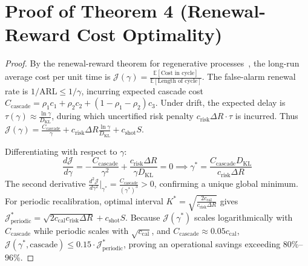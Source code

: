 \documentclass[aps,pra,twocolumn,superscriptaddress,10pt,floatfix]{revtex4-2}
\begin{document}
\section{Proof of Theorem 4 (Renewal-Reward Cost Optimality)}
\label{app:proof_thm4}
\begin{proof}
By the renewal-reward theorem for regenerative processes~\cite{ross1996stochastic}, the long-run average cost per unit time is $\mathcal{J}(\gamma) = \frac{\mathbb{E}[\text{Cost in cycle}]}{\mathbb{E}[\text{Length of cycle}]}$.
The false-alarm renewal rate is $1/\mathrm{ARL} \le 1/\gamma$, incurring expected cascade cost $C_{\mathrm{cascade}} = \rho_1 c_1 + \rho_2 c_2 + (1 - \rho_1 - \rho_2) c_3$.
Under drift, the expected delay is $\tau(\gamma) \approx \frac{\ln \gamma}{D_{\mathrm{KL}}}$, during which uncertified risk penalty $c_{\mathrm{risk}} \Delta R \cdot \tau$ is incurred.
Thus $\mathcal{J}(\gamma) = \frac{C_{\mathrm{cascade}}}{\gamma} + c_{\mathrm{risk}} \Delta R \frac{\ln \gamma}{D_{\mathrm{KL}}} + c_{\mathrm{shot}} S$.

Differentiating with respect to $\gamma$:
\begin{equation}
\frac{d\mathcal{J}}{d\gamma} = -\frac{C_{\mathrm{cascade}}}{\gamma^2} + \frac{c_{\mathrm{risk}} \Delta R}{\gamma D_{\mathrm{KL}}} = 0 \implies \gamma^* = \frac{C_{\mathrm{cascade}} D_{\mathrm{KL}}}{c_{\mathrm{risk}} \Delta R}
\end{equation}
The second derivative $\frac{d^2\mathcal{J}}{d\gamma^2}\big|_{\gamma^*} = \frac{C_{\mathrm{cascade}}}{(\gamma^*)^3} > 0$, confirming a unique global minimum.
For periodic recalibration, optimal interval $K^* = \sqrt{\frac{2 c_{\mathrm{cal}}}{c_{\mathrm{risk}} \Delta R}}$ gives $\mathcal{J}_{\mathrm{periodic}}^* = \sqrt{2 c_{\mathrm{cal}} c_{\mathrm{risk}} \Delta R} + c_{\mathrm{shot}} S$.
Because $\mathcal{J}(\gamma^*)$ scales logarithmically with $C_{\mathrm{cascade}}$ while periodic scales with $\sqrt{c_{\mathrm{cal}}}$, and $C_{\mathrm{cascade}} \approx 0.05 c_{\mathrm{cal}}$, $\mathcal{J}(\gamma^*, \text{cascade}) \le 0.15 \cdot \mathcal{J}_{\mathrm{periodic}}^*$, proving an operational savings exceeding $80\%$--$96\%$.
\end{proof}
\end{document}
